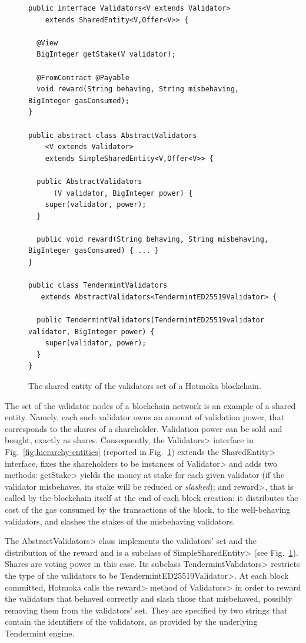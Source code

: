 \begin{figure}[t]
  \begin{center}
    \begin{lstlisting}[language=Takamaka]
public interface Validators<V extends Validator>
    extends SharedEntity<V,Offer<V>> {

  @View
  BigInteger getStake(V validator);

  @FromContract @Payable
  void reward(String behaving, String misbehaving, BigInteger gasConsumed);
}

public abstract class AbstractValidators
    <V extends Validator>
    extends SimpleSharedEntity<V,Offer<V>> {

  public AbstractValidators
      (V validator, BigInteger power) {
    super(validator, power);
  }

  public void reward(String behaving, String misbehaving, BigInteger gasConsumed) { ... }
}

public class TendermintValidators
   extends AbstractValidators<TendermintED25519Validator> {

  public TendermintValidators(TendermintED25519validator validator, BigInteger power) {
    super(validator, power);
  }
}
    \end{lstlisting}
  \end{center}
  \caption{The shared entity of the validators set of a Hotmoka blockchain.}\label{fig:validators}
\end{figure}


The set of the validator nodes of a blockchain network is an example of a shared entity.
Namely, each such validator owns an amount of validation power, that corresponds to the shares
of a shareholder. Validation power can be sold and bought, exactly as shares.
Consequently, the \<Validators> interface in Fig.~\ref{fig:hierarchy-entities}
(reported in Fig.~\ref{fig:validators})
extends the \<SharedEntity> interface, fixes the shareholders to be
instances of \<Validator> and adds two methods: \<getStake> yields the money
at stake for each given validator (if the validator misbehaves, its stake will be reduced or
\emph{slashed}); and \<reward>, that is called by the blockchain itself at the end of each
block creation: it distributes the cost of the gas consumed by the transactions of the block,
to the well-behaving validators, and slashes the stakes of the misbehaving validators.

The \<AbstractValidators> class implements the validators' set
and the distribution of the reward and is a subclass of \<SimpleSharedEntity>
(see Fig.~\ref{fig:validators}).
Shares are voting power in this case.
Its subclass \<TendermintValidators> restricts the type of the validators
to be \<TendermintED25519Validator>.
At each block committed, Hotmoka calls the \<reward> method of \<Validators>
in order to reward the validators that behaved correctly
and slash those that misbehaved, possibly removing them from the validators' set.
They are specified by two strings
that contain the identifiers of the validators, as provided by the underlying
Tendermint engine.

